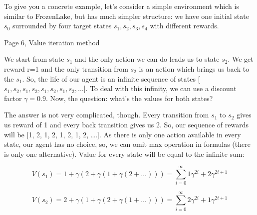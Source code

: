 To give you a concrete example, let’s consider a simple environment which is
similar to FrozenLake, but has much simpler structure: we have one initial state
\begin{math}s_0\end{math} surrounded by four target states \begin{math}s_1, s_2, s_3, s_4\end{math} with different rewards.

Page 6, Value iteration method

We start from state \begin{math}s_1\end{math} and the only action we can do leads us to state \begin{math}s_2\end{math}. We
get reward r=1 and the only transition from \begin{math}s_2\end{math} is an action which brings us back
to the \begin{math}s_1\end{math}. So, the life of our agent is an infinite sequence of states [
\begin{math}s_1, s_2, s_1, s_2, s_1, s_2, s_1, s_2,\ldots\end{math}]. To deal with this infinity, we can use a discount
factor \begin{math}\gamma=0.9\end{math}. Now, the question: what’s the values for both states?

The answer is not very complicated, though. Every transition from \begin{math}s_1\end{math} to \begin{math}s_2\end{math} gives
us reward of 1 and every back transition gives us 2. So, our sequence of rewards
will be [1, 2, 1, 2, 1, 2, 1, 2, ….]. As there is only one action available in
every state, our agent has no choice, so, we can omit max operation in formulas
(there is only one alternative). Value for every state will be equal to the
infinite sum:


\begin{equation*}
V(s_1) = 1 + \gamma (2 + \gamma(1 + \gamma(2 + \ldots))) = \sum_{i=0}^\infty 1\gamma^{2i}+2\gamma^{2i+1}  
\end{equation*}


\begin{equation*}
V(s_2) = 2 + \gamma (1 + \gamma(2 + \gamma(1 + \ldots))) = \sum_{i=0}^\infty 2\gamma^{2i}+1\gamma^{2i+1}    
\end{equation*}

